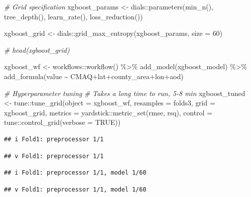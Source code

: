 \documentclass[
]{article}
\newenvironment{Shaded}{\begin{snugshade}}{\end{snugshade}}
\newcommand{\AttributeTok}[1]{\textcolor[rgb]{0.77,0.63,0.00}{#1}}
\newcommand{\CommentTok}[1]{\textcolor[rgb]{0.56,0.35,0.01}{\textit{#1}}}
\newcommand{\ConstantTok}[1]{\textcolor[rgb]{0.00,0.00,0.00}{#1}}
\newcommand{\DecValTok}[1]{\textcolor[rgb]{0.00,0.00,0.81}{#1}}
\newcommand{\FunctionTok}[1]{\textcolor[rgb]{0.00,0.00,0.00}{#1}}
\newcommand{\NormalTok}[1]{#1}
\newcommand{\OtherTok}[1]{\textcolor[rgb]{0.56,0.35,0.01}{#1}}
\newcommand{\SpecialCharTok}[1]{\textcolor[rgb]{0.00,0.00,0.00}{#1}}
\begin{document}
\begin{Shaded}
\begin{Highlighting}[]
\CommentTok{\# Grid specification}
\NormalTok{xgboost\_params }\OtherTok{\textless{}{-}}\NormalTok{ dials}\SpecialCharTok{::}\FunctionTok{parameters}\NormalTok{(}\FunctionTok{min\_n}\NormalTok{(), }\FunctionTok{tree\_depth}\NormalTok{(), }\FunctionTok{learn\_rate}\NormalTok{(), }\FunctionTok{loss\_reduction}\NormalTok{())}

\NormalTok{xgboost\_grid }\OtherTok{\textless{}{-}}\NormalTok{ dials}\SpecialCharTok{::}\FunctionTok{grid\_max\_entropy}\NormalTok{(xgboost\_params, }\AttributeTok{size =} \DecValTok{60}\NormalTok{)}

\CommentTok{\# head(xgboost\_grid)}

\NormalTok{xgboost\_wf }\OtherTok{\textless{}{-}}\NormalTok{ workflows}\SpecialCharTok{::}\FunctionTok{workflow}\NormalTok{() }\SpecialCharTok{\%\textgreater{}\%}
  \FunctionTok{add\_model}\NormalTok{(xgboost\_model) }\SpecialCharTok{\%\textgreater{}\%} 
  \FunctionTok{add\_formula}\NormalTok{(value }\SpecialCharTok{\textasciitilde{}}\NormalTok{ CMAQ}\SpecialCharTok{+}\NormalTok{lat}\SpecialCharTok{+}\NormalTok{county\_area}\SpecialCharTok{+}\NormalTok{lon}\SpecialCharTok{+}\NormalTok{aod)}

\CommentTok{\# Hyperparameter tuning}
\CommentTok{\# Takes a long time to run, 5{-}8 min}
\NormalTok{xgboost\_tuned }\OtherTok{\textless{}{-}}\NormalTok{ tune}\SpecialCharTok{::}\FunctionTok{tune\_grid}\NormalTok{(}\AttributeTok{object =}\NormalTok{ xgboost\_wf, }\AttributeTok{resamples =}\NormalTok{ folds3,}
  \AttributeTok{grid =}\NormalTok{ xgboost\_grid, }\AttributeTok{metrics =}\NormalTok{ yardstick}\SpecialCharTok{::}\FunctionTok{metric\_set}\NormalTok{(rmse, rsq),}
  \AttributeTok{control =}\NormalTok{ tune}\SpecialCharTok{::}\FunctionTok{control\_grid}\NormalTok{(}\AttributeTok{verbose =} \ConstantTok{TRUE}\NormalTok{))}
\end{Highlighting}
\end{Shaded}

\begin{verbatim}
## i Fold1: preprocessor 1/1
\end{verbatim}

\begin{verbatim}
## v Fold1: preprocessor 1/1
\end{verbatim}

\begin{verbatim}
## i Fold1: preprocessor 1/1, model 1/60
\end{verbatim}

\begin{verbatim}
## v Fold1: preprocessor 1/1, model 1/60
\end{verbatim}
\end{document}

